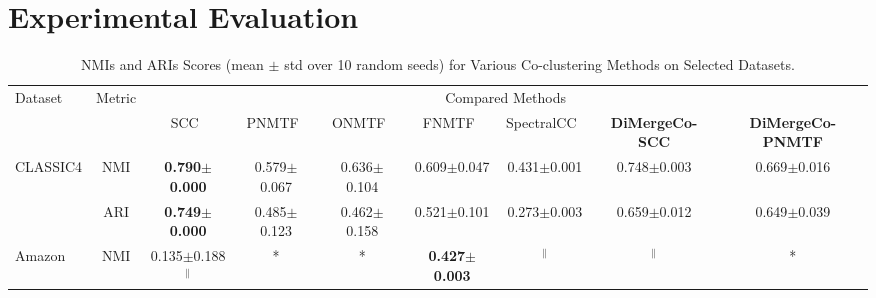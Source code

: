 \documentclass[journal]{IEEEtran}
\theoremstyle{definition}
\theoremstyle{remark} %
\renewcommand{\cite}[1]{~\autocite{#1}}
\begin{document}
\section{Experimental Evaluation}
\label{sec:experiment}

{\color{blue}
\begin{table}[htbp]
    \centering
    \caption{NMIs and ARIs Scores (mean $\pm$ std over 10 random seeds) for Various Co-clustering Methods on Selected Datasets.}
    \label{tab:evaluation-metrics}
    \begin{threeparttable}
        \begin{tabular}{@{} l c ccccccc @{}}
            \toprule
            \multirow{2}{*}{Dataset}    & \multirow{2}{*}{Metric} & \multicolumn{7}{c}{Compared Methods}                                                                                                                                                                                                                                                                         \\
            \cmidrule{3-9}
                                        &                         & SCC\cite{dhillon2001CoclusteringDocumentsWords} & PNMTF\cite{chen2023ParallelNonNegativeMatrix} & ONMTF\cite{ding2006OrthogonalNonnegativeMatrix} & FNMTF\cite{kim2011FastNonnegativeMatrix} & SpectralCC\cite{sklearn2011} & \textbf{DiMergeCo-SCC}          & \textbf{DiMergeCo-PNMTF}       \\
            \midrule
            \multirow{2}{*}{CLASSIC4}   & NMI                     & \textbf{0.790$\pm$0.000}                        & 0.579$\pm$0.067                               & 0.636$\pm$0.104                                     & 0.609$\pm$0.047                          & 0.431$\pm$0.001             & 0.748$\pm$0.003                 & 0.669$\pm$0.016                 \\
                                        & ARI                     & \textbf{0.749$\pm$0.000}                        & 0.485$\pm$0.123                               & 0.462$\pm$0.158                                     & 0.521$\pm$0.101                          & 0.273$\pm$0.003             & 0.659$\pm$0.012                 & 0.649$\pm$0.039                 \\
            \multirow{2}{*}{Amazon}     & NMI                     & 0.135$\pm$0.188$^{\|}$                          & *                                             & *                                               & \textbf{0.427$\pm$0.003}                 & $^{\|}$                      & $^{\|}$                         & *                               \\

\end{tabular}
\end{threeparttable}
\end{table}}
\end{document}
